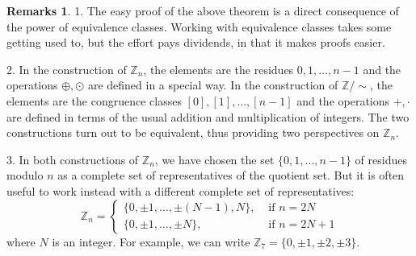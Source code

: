 \documentclass[11pt]{article}
\theoremstyle{definition}
\newtheorem{rmks}[thm]{Remarks}
\newcommand{\Z}{\mathbb{Z}} %
\begin{document}
\begin{rmks}
1. The easy proof of the above theorem is a direct consequence of the
power of equivalence classes. Working with equivalence classes takes
some getting used to, but the effort pays dividends, in that it makes
proofs easier.

2. In the construction of $\Z_n$, the elements are the residues
$0,1,\dots, n-1$ and the operations $\oplus, \odot$ are defined in a
special way. In the construction of $\Z/\!\!\sim$, the elements are
the congruence classes $[0],[1],\dots, [n-1]$ and the operations
$+, \cdot$ are defined in terms of the usual addition and
multiplication of integers. The two constructions turn out to be
equivalent, thus providing two perspectives on $\Z_n$.

3. In both constructions of $\Z_n$, we have chosen the set
$\{ 0, 1, \dots, n-1 \}$ of residues modulo $n$ as a complete set of
representatives of the quotient set. But it is often useful to work
instead with a different complete set of representatives:
\[
  \Z_n =
  \begin{cases}
    \{0, \pm 1, \dots, \pm(N-1), N \}, &\text{ if } n=2N \\
    \{0, \pm 1, \dots, \pm N\}, &\text{ if } n=2N+1
  \end{cases}
\]
where $N$ is an integer.  For example, we can write
$\Z_7 = \{ 0, \pm1, \pm 2, \pm 3\}$.
\end{rmks}
\end{document}
